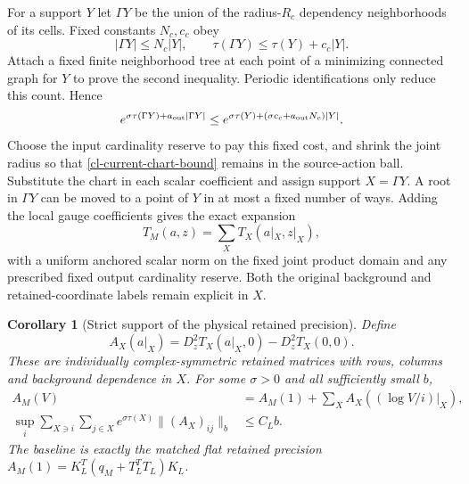 \documentclass[11pt]{article}
\newtheorem{corollary}[theorem]{Corollary}
\theoremstyle{remark}\newtheorem{remark}[theorem]{Remark}
\begin{document}
For a support $Y$ let $\Gamma Y$ be the union of the radius-$R_c$
dependency neighborhoods of its cells. Fixed constants $N_c,c_c$ obey
\begin{equation}
 |\Gamma Y|\le N_c|Y|,\qquad
 \tau(\Gamma Y)\le\tau(Y)+c_c|Y|.                           \label{cl-support-enlargement}
\end{equation}
Attach a fixed finite neighborhood tree at each point of a minimizing
connected graph for $Y$ to prove the second inequality. Periodic
identifications only reduce this count. Hence
\begin{equation}
 e^{\sigma\tau(\Gamma Y)+a_{\rm out}|\Gamma Y|}
 \le e^{\sigma\tau(Y)+(\sigma c_c+a_{\rm out}N_c)|Y|}.       \label{cl-composition-weight}
\end{equation}
Choose the input cardinality reserve to pay this fixed cost, and shrink
the joint radius so that \eqref{cl-current-chart-bound} remains in the
source-action ball. Substitute the chart in each scalar coefficient and
assign support $X=\Gamma Y$. A root in $\Gamma Y$ can be moved to a
point of $Y$ in at most a fixed number of ways. Adding the local gauge
coefficients gives the exact expansion
\begin{equation}
 T_M(a,z)=\sum_X T_X(a|_X,z|_X),                             \label{cl-pulled-support-expansion}
\end{equation}
with a uniform anchored scalar norm on the fixed joint product domain
and any prescribed fixed output cardinality reserve. Both the original
background and retained-coordinate labels remain explicit in $X$.

\begin{corollary}[Strict support of the physical retained precision]
\label{cl-precision-theorem}
Define
\begin{equation}
 A_X(a|_X)=D_z^2T_X(a|_X,0)-D_z^2T_X(0,0).                   \label{cl-precision-coefficients}
\end{equation}
These are individually complex-symmetric retained matrices with rows,
columns and background dependence in $X$. For some $\sigma>0$ and all
sufficiently small $b$,
\begin{align}
 A_M(V)&=A_M(1)+\sum_X A_X((\log V/i)|_X),                  \label{cl-precision-expansion}\\
 \sup_i\sum_{X\ni i}\sum_{j\in X}
 e^{\sigma\tau(X)}\|(A_X)_{ij}\|_b&\le C_L b.             \label{cl-precision-norm}
\end{align}
The baseline is exactly the matched flat retained precision
$A_M(1)=K_L^T(q_M+T_L^TT_L)K_L$.
\end{corollary}
\end{document}
